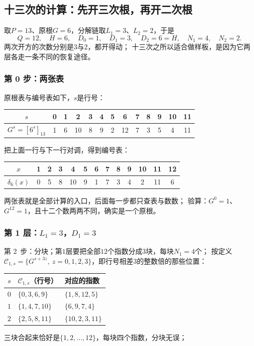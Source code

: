 \documentclass[UTF8,a4paper,11pt]{ctexart}
\begin{document}
\subsection{十三次的计算：先开三次根，再开二次根}
取$P=13$、原根$G=6$，分解链取$L_1=3$、$L_2=2$，于是
\[
 Q=12,\quad H=6,\quad D_0=1,\quad D_1=3,\quad D_2=6=H,\quad
 N_1=4,\quad N_2=2.
\]
两次开方的次数分别是$3$与$2$，都开得动；
十三次之所以适合做样板，是因为它两层各走一条不同的恢复途径。

\subsubsection{第 0 步：两张表}
原根表与编号表如下，$s$是行号：
\begin{center}
\begin{tabular}{c|cccccccccccc}
\toprule
$s$ & 0&1&2&3&4&5&6&7&8&9&10&11\\
\midrule
$G^s=[6^s]_{13}$ & 1&6&10&8&9&2&12&7&3&5&4&11\\
\bottomrule
\end{tabular}
\end{center}
把上面一行与下一行对调，得到编号表：
\begin{center}
\begin{tabular}{c|cccccccccccc}
\toprule
$x$ & 1&2&3&4&5&6&7&8&9&10&11&12\\
\midrule
$\delta_6(x)$ & 0&5&8&10&9&1&7&3&4&2&11&6\\
\bottomrule
\end{tabular}
\end{center}
两张表就是全部计算的入口，后面每一步都只查表与数数；
验算：$G^0=1$、$G^{12}=1$，且十二个数两两不同，确实是一个原根。

\subsubsection{第 1 层：$L_1=3$，$D_1=3$}
第 2~步：分块；第$1$层要把全部$12$个指数分成$3$块，每块$N_1=4$个；
按定义$\mathscr{C}_{1,s}=\{G^{s+3z},\ z=0,1,2,3\}$，即行号相差$3$的整数倍的那些位置：
\begin{center}
\begin{tabular}{c|l|l}
\toprule
$s$ & $\mathscr{C}_{1,s}$（行号） & 对应的指数 \\
\midrule
$0$ & $\{0,3,6,9\}$ & $\{1,8,12,5\}$ \\
$1$ & $\{1,4,7,10\}$ & $\{6,9,7,4\}$ \\
$2$ & $\{2,5,8,11\}$ & $\{10,2,3,11\}$ \\
\bottomrule
\end{tabular}
\end{center}
三块合起来恰好是$\{1,2,\dots,12\}$，每块四个指数，分块无误；
\end{document}
